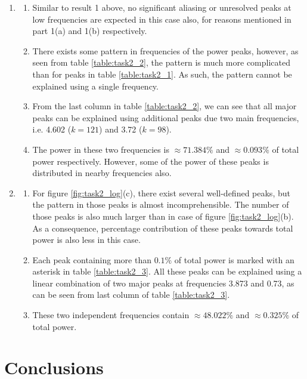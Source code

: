 \documentclass[a4paper]{article}
\begin{document}
\begin{enumerate}
			\item \begin{enumerate}
				\item Similar to result 1 above, no significant aliasing or unresolved peaks at low frequencies are expected in this case also, for reasons mentioned in part 1(a) and 1(b) respectively. 
				\item There exists some pattern in frequencies of the power peaks, however, as seen from table \ref{table:task2_2}, the pattern is much more complicated than for peaks in table \ref{table:task2_1}. As such, the pattern cannot be explained using a single frequency.
				\item From the last column in table \ref{table:task2_2}, we can see that all major peaks can be explained using additional peaks due two main frequencies, i.e. 4.602 (\(k=121\)) and 3.72 (\(k=98\)). 
				\item The power in these two frequencies is \(\approx 71.384\%\) and \(\approx 0.093\%\) of total power respectively. However, some of the power of these peaks is distributed in nearby frequencies also.
			\end{enumerate}
		
			\item \begin{enumerate}
				\item For figure \ref{fig:task2_log}(c), there exist several well-defined peaks, but the pattern in those peaks is almost incomprehensible. The number of those peaks is also much larger than in case of figure \ref{fig:task2_log}(b). As a consequence, percentage contribution of these peaks towards total power is also less in this case.
				\item Each peak containing more than \(0.1\%\) of total power is marked with an asterisk in table \ref{table:task2_3}. All these peaks can be explained using a linear combination of two major peaks at frequencies 3.873 and 0.73, as can be seen from last column of table \ref{table:task2_3}.
				\item These two independent frequencies contain \(\approx 48.022\%\) and \(\approx 0.325\%\) of total power.   
			\end{enumerate}
			
		\end{enumerate}
	
	
	\section{Conclusions} \label{conclusions}
	
\end{document}
